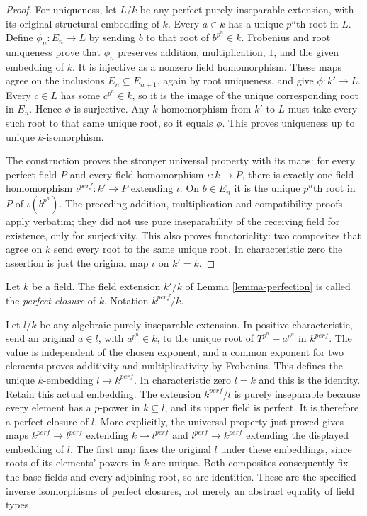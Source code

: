 \begin{proof}
For uniqueness, let $L/k$ be any perfect purely
inseparable extension, with its original
structural embedding of $k$. Every $a\in k$
has a unique $p^n$th root in $L$. Define
$\phi_n:E_n\to L$ by sending $b$ to that
root of $b^{p^n}\in k$. Frobenius and root
uniqueness prove that $\phi_n$ preserves
addition, multiplication, $1$, and the given
embedding of $k$. It is injective as a
nonzero field homomorphism. These maps agree
on the inclusions $E_n\subseteq E_{n+1}$,
again by root uniqueness, and give
$\phi:k'\to L$. Every $c\in L$ has some
$c^{p^n}\in k$, so it is the image of the
unique corresponding root in $E_n$.
Hence $\phi$ is surjective. Any $k$-homomorphism
from $k'$ to $L$ must take every such root
to that same unique root, so it equals $\phi$.
This proves uniqueness up to unique
$k$-isomorphism.

The construction proves the stronger universal
property with its maps: for every perfect
field $P$ and every field homomorphism
$\iota:k\to P$, there is exactly one field
homomorphism $\iota^{perf}:k'\to P$ extending
$\iota$. On $b\in E_n$ it is the unique
$p^n$th root in $P$ of $\iota(b^{p^n})$.
The preceding addition, multiplication and
compatibility proofs apply verbatim; they
did not use pure inseparability of the
receiving field for existence, only for
surjectivity. This also proves functoriality:
two composites that agree on $k$ send every
root to the same unique root. In
characteristic zero the assertion is just
the original map $\iota$ on $k'=k$.
\end{proof}

\begin{definition}
\label{definition-perfection}
Let $k$ be a field. The field extension $k'/k$ of Lemma \ref{lemma-perfection}
is called the {\it perfect closure} of $k$. Notation $k^{perf}/k$.
\end{definition}

\noindent
Let $l/k$ be any algebraic purely inseparable
extension. In positive characteristic, send an
original $a\in l$, with $a^{p^n}\in k$, to
the unique root of $T^{p^n}-a^{p^n}$ in
$k^{perf}$. The value is independent of the
chosen exponent, and a common exponent for
two elements proves additivity and
multiplicativity by Frobenius. This defines
the unique $k$-embedding $l\to k^{perf}$.
In characteristic zero $l=k$ and this is
the identity. Retain this actual embedding.
The extension $k^{perf}/l$ is purely
inseparable because every element has a
$p$-power in $k\subseteq l$, and its upper
field is perfect. It is therefore a
perfect closure of $l$. More explicitly,
the universal property just proved gives
maps $k^{perf}\to l^{perf}$ extending
$k\to l^{perf}$ and $l^{perf}\to k^{perf}$
extending the displayed embedding of $l$.
The first map fixes the original $l$
under these embeddings, since roots of
its elements' powers in $k$ are unique.
Both composites consequently fix the
base fields and every adjoining root,
so are identities. These are the
specified inverse isomorphisms of
perfect closures, not merely an
abstract equality of field types.

